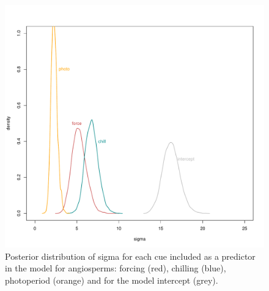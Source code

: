 \documentclass{article}\usepackage[]{graphicx}\usepackage[]{color}
\begin{document}
\begin{figure} [H]
  \begin{center}
  \includegraphics[width=14cm]{..//..//analyses/phylogeny/figures/sigmas_density_lambda0.pdf}
  \caption{Posterior distribution of sigma for each cue included as a predictor in the model for angiosperms: forcing (red), chilling (blue),  photoperiod (orange) and for the model intercept (grey).}
  \label{fig:sigmas}
  \end{center}
\end{figure}
\end{document}
